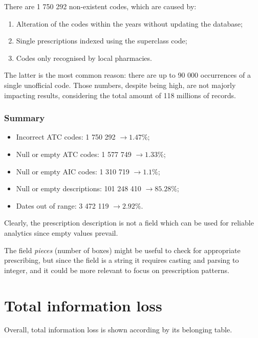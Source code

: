 There are 1 750 292 non-existent codes, which are caused by:
\begin{enumerate}
	\item Alteration of the codes within the years without updating the database;
	\item Single prescriptions indexed using the superclass code;
	\item Codes only recognised by local pharmacies.
\end{enumerate}

The latter is the most common reason: there are up to 90 000 occurrences of a single unofficial code. Those numbers, despite being high, are not majorly impacting results, considering the total amount of 118 millions of records.

\subsubsection{Summary}
\begin{itemize}
	\item Incorrect ATC codes: 1 750 292 $\rightarrow 1.47\%$;
	\item Null or empty ATC codes: 1 577 749 $\rightarrow 1.33\%$;
	\item Null or empty AIC codes: 1 310 719 $\rightarrow 1.1\%$;
	\item Null or empty descriptions: 101 248 410 $\rightarrow 85.28\%$;
	\item Dates out of range: 3 472 119 $\rightarrow 2.92\%$.
\end{itemize}

Clearly, the prescription description is not a field which can be used for reliable analytics since empty values prevail.

The field \textit{pieces} (number of boxes) might be useful to check for appropriate prescribing, but since the field is a string it requires casting and parsing to integer, and it could be more relevant to focus on prescription patterns.

\section{Total information loss}
Overall, total information loss is shown according by its belonging table. 

